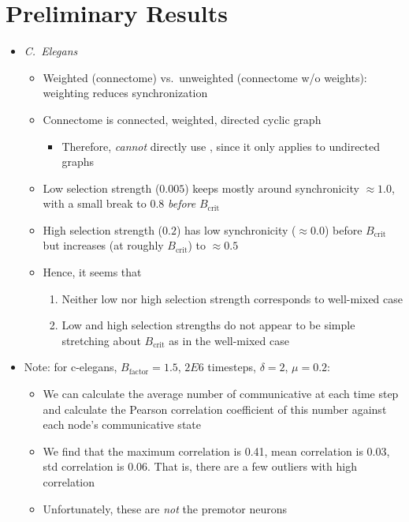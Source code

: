 \documentclass[openacc]{class/rsprocb_new}
\begin{document}
\section{Preliminary Results}
\begin{itemize}
  \item \emph{C.\ Elegans}
  \begin{itemize}
    \item Weighted (connectome) vs.\ unweighted (connectome w/o
      weights): weighting reduces synchronization
    \item Connectome is connected, weighted, directed cyclic graph
    \begin{itemize}
      \item Therefore, \emph{cannot} directly use
        \cite{allen2017evolutionary}, since it only applies to undirected
        graphs
    \end{itemize}
    \item Low selection strength ($0.005$) keeps mostly around synchronicity
      $\approx 1.0$, with a small break to 0.8 \emph{before} $B_{\text{crit}}$
    \item High selection strength ($0.2$) has low synchronicity
      ($\approx 0.0$) before $B_{\text{crit}}$ but increases (at roughly
      $B_{\text{crit}}$) to $\approx 0.5$
    \item Hence, it seems that
    \begin{enumerate}
      \item Neither low nor high selection strength corresponds to
        well-mixed case
      \item Low and high selection strengths do not appear to be simple
        stretching about $B_{\text{crit}}$ as in the well-mixed case
    \end{enumerate}
  \end{itemize}
  \item Note: for c-elegans, $B_{\text{factor}} = 1.5$, $2E6$ timesteps,
    $\delta = 2$, $\mu = 0.2$:
  \begin{itemize}
    \item We can calculate the average number of communicative at each
      time step and calculate the Pearson correlation coefficient of
      this number against each node's communicative state
    \item We find that the maximum correlation is \num{0.41}, mean
      correlation is \num{0.03}, std correlation is \num{0.06}. That
      is, there are a few outliers with high correlation
    \item Unfortunately, these are \emph{not} the premotor neurons

\end{itemize}
\end{itemize}
\end{document}
